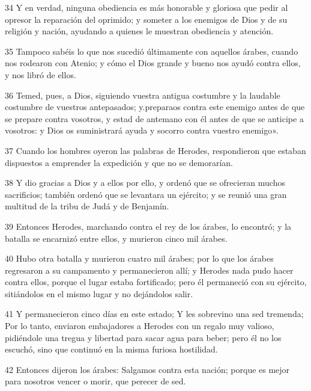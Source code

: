 \par 34 Y en verdad, ninguna obediencia es más honorable y gloriosa que pedir al opresor la reparación del oprimido; y someter a los enemigos de Dios y de su religión y nación, ayudando a quienes le muestran obediencia y atención.

\par 35 Tampoco sabéis lo que nos sucedió últimamente con aquellos árabes, cuando nos rodearon con Atenio; y cómo el Dios grande y bueno nos ayudó contra ellos, y nos libró de ellos.

\par 36 Temed, pues, a Dios, siguiendo vuestra antigua costumbre y la laudable costumbre de vuestros antepasados; y.preparaos contra este enemigo antes de que se prepare contra vosotros, y estad de antemano con él antes de que se anticipe a vosotros: y Dios os suministrará ayuda y socorro contra vuestro enemigo».

\par 37 Cuando los hombres oyeron las palabras de Herodes, respondieron que estaban dispuestos a emprender la expedición y que no se demorarían.

\par 38 Y dio gracias a Dios y a ellos por ello, y ordenó que se ofrecieran muchos sacrificios; también ordenó que se levantara un ejército; y se reunió una gran multitud de la tribu de Judá y de Benjamín.

\par 39 Entonces Herodes, marchando contra el rey de los árabes, lo encontró; y la batalla se encarnizó entre ellos, y murieron cinco mil árabes.

\par 40 Hubo otra batalla y murieron cuatro mil árabes; por lo que los árabes regresaron a su campamento y permanecieron allí; y Herodes nada pudo hacer contra ellos, porque el lugar estaba fortificado; pero él permaneció con su ejército, sitiándolos en el mismo lugar y no dejándolos salir.

\par 41 Y permanecieron cinco días en este estado; Y les sobrevino una sed tremenda; Por lo tanto, enviaron embajadores a Herodes con un regalo muy valioso, pidiéndole una tregua y libertad para sacar agua para beber; pero él no los escuchó, sino que continuó en la misma furiosa hostilidad.

\par 42 Entonces dijeron los árabes: Salgamos contra esta nación; porque es mejor para nosotros vencer o morir, que perecer de sed.


